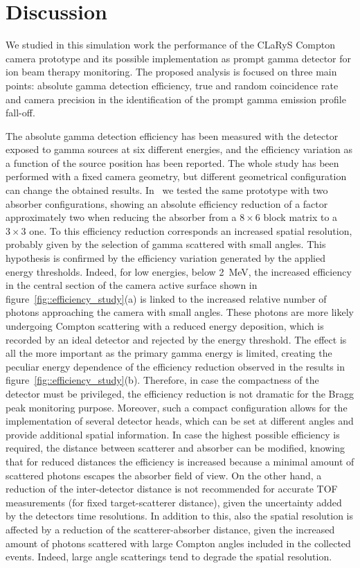 \section{Discussion}

We studied in this simulation work the performance of the CLaRyS Compton camera prototype and its possible implementation as prompt gamma detector for ion beam therapy monitoring. The proposed analysis is focused on three main points: absolute gamma detection efficiency, true and random coincidence rate and camera precision in the identification of the prompt gamma emission profile fall-off.

The absolute gamma detection efficiency has been measured with the detector exposed to gamma sources at six different energies, and the efficiency variation as a function of the source position has been reported. The whole study has been performed with a fixed camera geometry, but different geometrical configuration can change the obtained results. In~\cite{Fontana_APPB} we tested the same prototype with two absorber configurations, showing an absolute efficiency reduction of a factor approximately two when reducing the absorber from a $8\times6$ block matrix to a $3\times3$ one. To this efficiency reduction corresponds an increased spatial resolution, probably given by the selection of gamma scattered with small angles. This hypothesis is confirmed by the efficiency variation generated by the applied energy thresholds. Indeed, for low energies, below 2~MeV, the increased efficiency in the central section of the camera active surface shown in figure~\ref{fig::efficiency_study}(a) is linked to the increased relative number of photons approaching the camera with small angles. These photons are more likely undergoing Compton scattering with a reduced energy deposition, which is recorded by an ideal detector and rejected by the energy threshold. The effect is all the more important as the primary gamma energy is limited, creating the peculiar energy dependence of the efficiency reduction observed in the results in figure~\ref{fig::efficiency_study}(b). Therefore, in case the compactness of the detector must be privileged, the efficiency reduction is not dramatic for the Bragg peak monitoring purpose. Moreover, such a compact configuration allows for the implementation of several detector heads, which can be set at different angles and provide additional spatial information. In case the highest possible efficiency is required, the distance between scatterer and absorber can be modified, knowing that for reduced distances the efficiency is increased because a minimal amount of scattered photons escapes the absorber field of view. On the other hand, a reduction of the inter-detector distance is not recommended for accurate TOF measurements (for fixed target-scatterer distance), given the uncertainty added by the detectors time resolutions. In addition to this, also the spatial resolution is affected by a reduction of the scatterer-absorber distance, given the increased amount of photons scattered with large Compton angles included in the collected events. Indeed, large angle scatterings tend to degrade the spatial resolution.   
